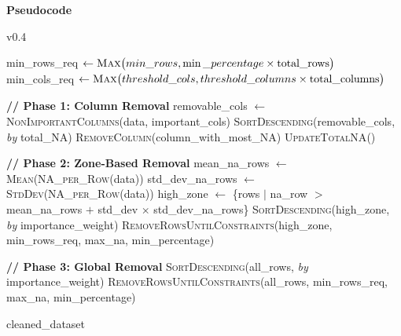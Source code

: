 \documentclass[a4paper,12pt]{article}
\begin{document}
\textbf{Pseudocode}
\begin{algorithm}[H]
\caption{v0.4}
\begin{algorithmic}[1]
    \State min\_rows\_req $\gets \textsc{Max}\big(min\_rows, \min\_percentage \times \text{total\_rows}\big)$
    \State min\_cols\_req $\gets \textsc{Max}\big(threshold\_cols, \textstyle threshold\_columns \times \text{total\_columns}\big)$
    
    \State \textbf{// Phase 1: Column Removal}
    \State removable\_cols $\gets$ \textsc{NonImportantColumns}(data, important\_cols)
    \State \textsc{SortDescending}(removable\_cols, \textit{by} total\_NA)
        \State \textsc{RemoveColumn}(column\_with\_most\_NA)
        \State \textsc{UpdateTotalNA}()
    \EndWhile
    
    \State \textbf{// Phase 2: Zone-Based Removal}
    \State mean\_na\_rows $\gets$ \textsc{Mean}(\textsc{NA\_per\_Row}(data))
    \State std\_dev\_na\_rows $\gets$ \textsc{StdDev}(\textsc{NA\_per\_Row}(data))
    \State high\_zone $\gets$ \{rows $|$ na\_row $>$ mean\_na\_rows $+$ std\_dev $\times$ std\_dev\_na\_rows\}
    \State \textsc{SortDescending}(high\_zone, \textit{by} importance\_weight)
    \State \textsc{RemoveRowsUntilConstraints}(high\_zone, min\_rows\_req, max\_na, min\_percentage)
    
    \State \textbf{// Phase 3: Global Removal}
        \State \textsc{SortDescending}(all\_rows, \textit{by} importance\_weight)
        \State \textsc{RemoveRowsUntilConstraints}(all\_rows, min\_rows\_req, max\_na, min\_percentage)
    \EndIf
    
    \State \Return cleaned\_dataset
\EndFunction
\end{algorithmic}
\end{algorithm}
\end{document}
